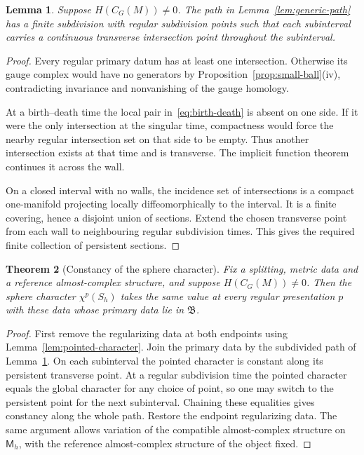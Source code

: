 \documentclass[11pt]{amsart}
\newtheorem{theorem}{Theorem}[section]
\newtheorem{lemma}[theorem]{Lemma}
\theoremstyle{definition}
\theoremstyle{remark}
\theoremstyle{plain}
\numberwithin{equation}{section}
\newcommand{\Msf}{\mathsf M}
\begin{document}
\begin{lemma}\label{lem:persistent}
Suppose $H(C_G(M))\ne0$. The path in
Lemma~\ref{lem:generic-path} has a finite
subdivision with regular subdivision
points such that each subinterval carries
a continuous transverse intersection
point throughout the subinterval.
\end{lemma}
\begin{proof}
Every regular primary datum has at least
one intersection. Otherwise its gauge
complex would have no generators by
Proposition~\ref{prop:small-ball}(iv),
contradicting invariance and nonvanishing
of the gauge homology.

At a birth--death time the local pair
in~\eqref{eq:birth-death} is absent on
one side. If it were the only intersection
at the singular time, compactness would
force the nearby regular intersection set
on that side to be empty. Thus another
intersection exists at that time and is
transverse. The implicit function theorem
continues it across the wall.

On a closed interval with no walls, the
incidence set of intersections is a
compact one-manifold projecting locally
diffeomorphically to the interval. It is
a finite covering, hence a disjoint union
of sections. Extend the chosen transverse
point from each wall to neighbouring
regular subdivision times. This gives
the required finite collection of
persistent sections.
\end{proof}

\begin{theorem}[Constancy of the sphere character]
\label{thm:character-constancy}
Fix a splitting, metric data and a reference
almost-complex structure, and suppose
$H(C_G(M))\ne0$. Then the sphere character
$\chi^p(S_h)$ takes the same value at every
regular presentation $p$ with these data whose
primary data lie in $\mathfrak B$.
\end{theorem}
\begin{proof}
First remove the regularizing data at
both endpoints using
Lemma~\ref{lem:pointed-character}. Join
the primary data by the subdivided path
of Lemma~\ref{lem:persistent}. On each
subinterval the pointed character is
constant along its persistent transverse
point. At a regular subdivision time the
pointed character equals the global
character for any choice of point, so
one may switch to the persistent point
for the next subinterval. Chaining these
equalities gives constancy along the
whole path. Restore the endpoint
regularizing data. The same argument
allows variation of the compatible almost-complex structure on $\Msf_h$, with the reference almost-complex structure of the object fixed.
\end{proof}
\end{document}
